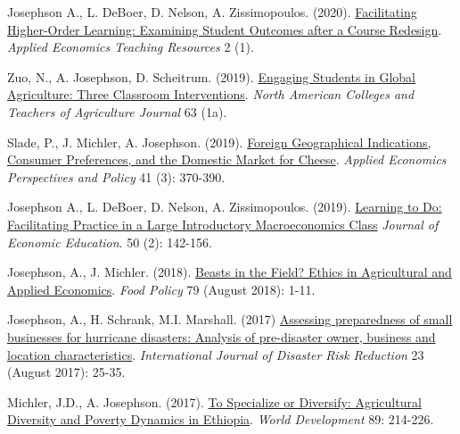 \documentclass[letterpaper]{article}
\begin{document}
\begin{etaremune}
\item Josephson A., L. DeBoer, D. Nelson, A. Zissimopoulos. (2020). \href{https://www.aaea.org/UserFiles/file/AETR_2019_012ProofFinal_v1.pdf}{Facilitating Higher-Order Learning: Examining Student Outcomes after a Course Redesign}. \emph{Applied Economics Teaching Resources} 2 (1). 
   	
\item Zuo, N., A. Josephson, D. Scheitrum. (2019). \href{https://www.nactateachers.org/index.php/volume-63-1a-special-issue-december-2019/2915-special-issue-2019-engaging-students-in-global-agriculture-engaging-students-in-global-agriculture-three-authentic-learning-classroom-three-authentic-learning-classroom-interventions}{Engaging Students in Global Agriculture: Three Classroom Interventions}. \emph{North American Colleges and Teachers of Agriculture Journal} 63 (1a).
   	
\item Slade, P., J. Michler, A. Josephson. (2019). \href{https://academic.oup.com/aepp/article-abstract/41/3/370/5544729}{Foreign Geographical Indications, Consumer Preferences, and the Domestic Market for Cheese}. \emph{Applied Economics Perspectives and Policy} 41 (3): 370-390.

\item Josephson A., L. DeBoer, D. Nelson, A. Zissimopoulos. (2019).
\href{https://www.tandfonline.com/doi/full/10.1080/00220485.2019.1582384}{Learning to Do:  Facilitating Practice in a Large Introductory Macroeconomics Class} \textit{Journal of Economic Education}. 50 (2): 142-156.

\item Josephson, A., J. Michler. (2018). \href{https://www.sciencedirect.com/science/article/pii/S0306919218305372}{Beasts in the Field? Ethics in Agricultural and Applied Economics}. \textit{Food Policy} 79 (August 2018): 1-11.

\item Josephson, A., H. Schrank, M.I. Marshall. (2017) \href{http://www.sciencedirect.com/science/article/pii/S2212420916303855}{Assessing preparedness of small businesses for hurricane disasters: Analysis of pre-disaster owner, business and location characteristics}. \textit{International Journal of Disaster Risk Reduction} 23 (August 2017): 25-35.  

\item Michler, J.D., A. Josephson. (2017). \href{http://www.sciencedirect.com/science/article/pii/S0305750X15308275}{To Specialize or Diversify: Agricultural Diversity and Poverty Dynamics in Ethiopia}. \textit{World Development} 89: 214-226. 


\end{etaremune}
\end{document}
